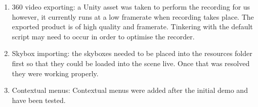 \documentclass{article}
\begin{document}
\begin{flushleft}
\begin{enumerate}
			\item 360 video exporting: a Unity asset was taken to perform the recording for us however, it currently runs at a low framerate when recording takes place. The exported product
			is of high quality and framerate. Tinkering with the default script may need to occur in order to optimise the recorder.
			\item Skybox importing: the skyboxes needed to be placed into the resources folder first so that they could be loaded into the scene live. Once that was resolved they were working properly.
			\item Contextual menus: Contextual menus were added after the initial demo and have been tested.
			
		\end{enumerate}
	\end{flushleft}
\end{document}
